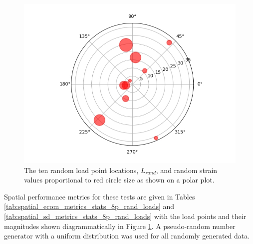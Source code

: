 \begin{figure}[H]
    \centering
    \includegraphics[width=0.7\linewidth]{Figures/rand1_strain_aplc_points.jpg}
    \caption{The ten random load point locations, $L_{rand}$, and random strain values proportional to red circle size as shown on a polar plot.}
    \label{fig:rand1_load_locs}
\end{figure}

Spatial performance metrics for these tests are given in Tables \ref{tab:spatial_ecom_metrics_stats_8p_rand_loads} and \ref{tab:spatial_sd_metrics_stats_8p_rand_loads} with the load points and their magnitudes shown diagrammatically in Figure \ref{fig:rand1_load_locs}. A pseudo-random number generator with a uniform distribution was used for all randomly generated data.


